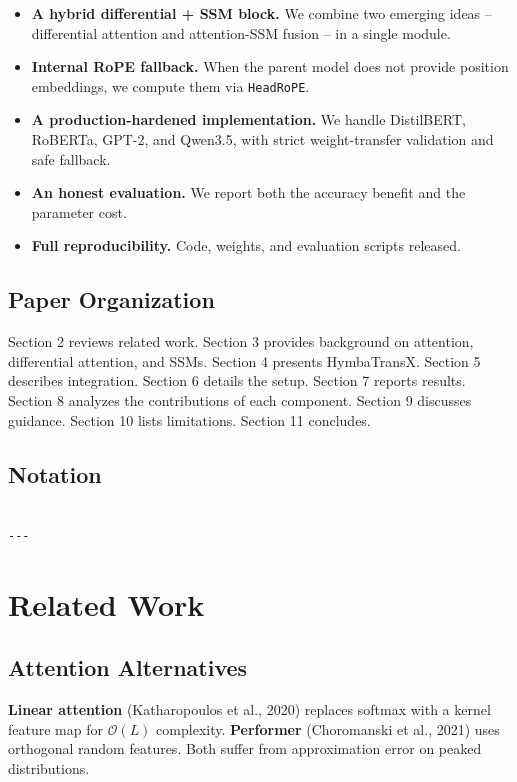 \begin{itemize}
\item \textbf{A hybrid differential + SSM block.} We combine two emerging ideas --
  differential attention and attention-SSM fusion -- in a single module.
\item \textbf{Internal RoPE fallback.} When the parent model does not provide
  position embeddings, we compute them via \texttt{HeadRoPE}.
\item \textbf{A production-hardened implementation.} We handle DistilBERT, RoBERTa,
  GPT-2, and Qwen3.5, with strict weight-transfer validation and safe
  fallback.
\item \textbf{An honest evaluation.} We report both the accuracy benefit and the
  parameter cost.
\item \textbf{Full reproducibility.} Code, weights, and evaluation scripts released.

\end{itemize}
\subsection{Paper Organization}

Section 2 reviews related work. Section 3 provides background on attention, 
differential attention, and SSMs. Section 4 presents HymbaTransX. Section 5 
describes integration. Section 6 details the setup. Section 7 reports 
results. Section 8 analyzes the contributions of each component. Section 9 
discusses guidance. Section 10 lists limitations. Section 11 concludes.



\subsection{Notation}

\begin{lstlisting}

---
\end{lstlisting}

\section{Related Work}

\subsection{Attention Alternatives}

\textbf{Linear attention} (Katharopoulos et al., 2020) replaces softmax with a 
kernel feature map for $\mathcal{O}(L)$ complexity. \textbf{Performer} 
(Choromanski et al., 2021) uses orthogonal random features. Both suffer 
from approximation error on peaked distributions.

